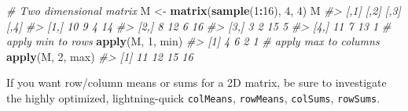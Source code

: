 \documentclass[]{book}
\newenvironment{Shaded}{\begin{snugshade}}{\end{snugshade}}
\newcommand{\CommentTok}[1]{\textcolor[rgb]{0.56,0.35,0.01}{\textit{#1}}}
\newcommand{\DecValTok}[1]{\textcolor[rgb]{0.00,0.00,0.81}{#1}}
\newcommand{\KeywordTok}[1]{\textcolor[rgb]{0.13,0.29,0.53}{\textbf{#1}}}
\newcommand{\NormalTok}[1]{#1}
\newcommand{\OperatorTok}[1]{\textcolor[rgb]{0.81,0.36,0.00}{\textbf{#1}}}
\newcommand{\StringTok}[1]{\textcolor[rgb]{0.31,0.60,0.02}{#1}}
\theoremstyle{definition}
\theoremstyle{definition}
\theoremstyle{definition}
\theoremstyle{remark}
\begin{document}
\begin{Shaded}
\begin{Highlighting}[]
\CommentTok{# Two dimensional matrix}
\NormalTok{M <-}\StringTok{ }\KeywordTok{matrix}\NormalTok{(}\KeywordTok{sample}\NormalTok{(}\DecValTok{1}\OperatorTok{:}\DecValTok{16}\NormalTok{), }\DecValTok{4}\NormalTok{, }\DecValTok{4}\NormalTok{)}
\NormalTok{M}
\CommentTok{#>      [,1] [,2] [,3] [,4]}
\CommentTok{#> [1,]   10    9    4   14}
\CommentTok{#> [2,]    8   12    6   16}
\CommentTok{#> [3,]    3    2   15    5}
\CommentTok{#> [4,]   11    7   13    1}
\CommentTok{# apply min to rows}
\KeywordTok{apply}\NormalTok{(M, }\DecValTok{1}\NormalTok{, min)}
\CommentTok{#> [1] 4 6 2 1}
\CommentTok{# apply max to columns}
\KeywordTok{apply}\NormalTok{(M, }\DecValTok{2}\NormalTok{, max)}
\CommentTok{#> [1] 11 12 15 16}
\end{Highlighting}
\end{Shaded}

If you want row/column means or sums for a 2D matrix, be sure to
investigate the highly optimized, lightning-quick \texttt{colMeans},
\texttt{rowMeans}, \texttt{colSums}, \texttt{rowSums}.
\end{document}

